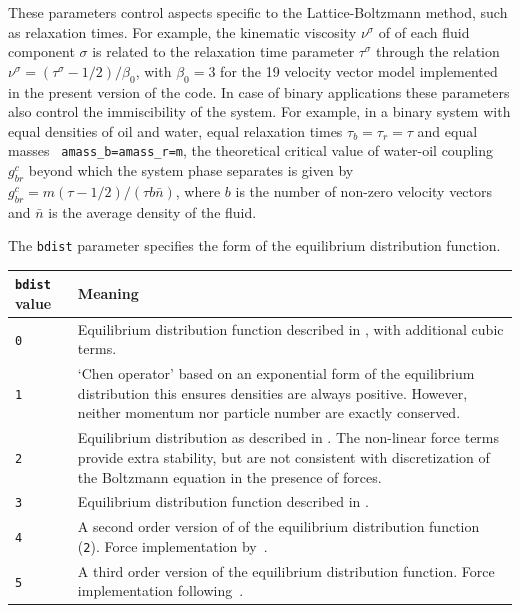 \documentclass[a4paper]{article}
\begin{document}
These parameters control aspects specific to the Lattice-Boltzmann method,
such as relaxation times. For example, the kinematic viscosity $\nu^{\sigma}$
of of each fluid component $\sigma$ is related to the relaxation time
parameter $\tau^{\sigma}$ through the relation \cite{bib:maziar1} $\nu^\sigma
= (\tau^{\sigma}- 1/2)/\beta_0$, with $\beta_0=3$ for the 19 velocity vector
model implemented in the present version of the code. In case of binary
applications these parameters also control the immiscibility of the
system. For example, in a binary system with equal densities of oil and water,
equal relaxation times $\tau_b=\tau_r=\tau$ and equal masses {\tt
  amass\_b=amass\_r=m}, the theoretical critical value of water-oil coupling
$g_{br}^c$ beyond which the system phase separates is given by
\cite{bib:shan-chen} $ g_{br}^{c}= m(\tau-1/2)/(\tau b \bar{n})$, where $b$ is
the number of non-zero velocity vectors and $\bar{n}$ is the average density
of the fluid.

\bigskip


\bigskip

The {\tt bdist} parameter specifies the form of the equilibrium distribution
function. 

\bigskip

\begin{tabular}{|l|p{115mm}|}
	\hline
{\tt bdist} value	&	Meaning	\\
	\hline
{\tt 0  }	& Equilibrium distribution function described in
		\cite{bib:maziar2}, with additional cubic terms. \\
{\tt 1  }	& `Chen operator' based on an exponential form of the
equilibrium distribution this ensures densities are always positive. However,
neither momentum nor particle number are exactly conserved.\\
{\tt 2 }	& Equilibrium distribution as described in \cite{bib:maziar1}.
The non-linear force terms provide extra stability, but are not consistent with
discretization of the Boltzmann equation in the presence of forces.\\
{\tt 3 }	& Equilibrium distribution function described in
		\cite{bib:maziar2}.\\
{\tt 4 }	& A second order version of of the equilibrium distribution
function ({\tt 2}). Force implementation by~\cite{PhysRevE.65.046308}. \\
{\tt 5 }	& A third order version of the equilibrium distribution function. Force implementation
following~\cite{PhysRevE.65.046308}. \\

\hline
\end{tabular}
\end{document}
